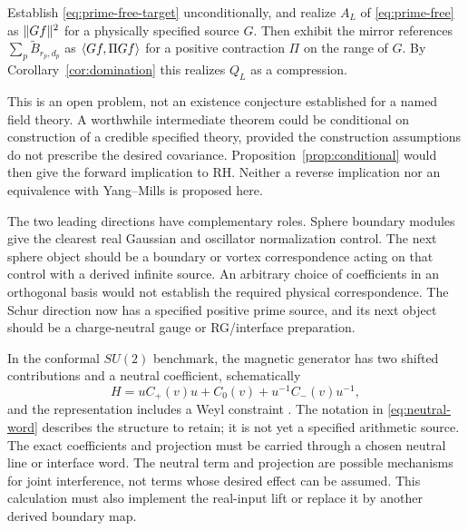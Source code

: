 \begin{problem}\label{prob:subtraction}
Establish \eqref{eq:prime-free-target} unconditionally, and realize
$A_L$ of \eqref{eq:prime-free} as $\lVert Gf\rVert^2$ for a physically specified
source $G$. Then exhibit the mirror references
$\sum_p\widetilde B_{r_p,d_p}$ as $\langle Gf,\Pi Gf\rangle$ for a positive
contraction $\Pi$ on the range of $G$. By
Corollary~\ref{cor:domination} this realizes $Q_L$ as a compression.
\end{problem}

This is an open problem, not an existence conjecture established for
a named field theory. A worthwhile intermediate theorem could be
conditional on construction of a credible specified theory, provided
the construction assumptions do not prescribe the desired covariance.
Proposition~\ref{prop:conditional} would then give the forward
implication to RH. Neither a reverse implication nor an equivalence
with Yang--Mills is proposed here.

The two leading directions have complementary roles. Sphere boundary
modules give the clearest real Gaussian and oscillator normalization
control. The next sphere object should be a boundary or vortex
correspondence acting on that control with a derived infinite source.
An arbitrary choice of coefficients in an orthogonal basis would not
establish the required physical correspondence. The Schur direction
now has a specified positive prime source, and its next object should
be a charge-neutral gauge or RG/interface preparation.

In the conformal $SU(2)$ benchmark, the magnetic generator has two
shifted contributions and a neutral coefficient, schematically
\begin{equation}\label{eq:neutral-word}
 H=uC_+(v)u+C_0(v)+u^{-1}C_-(v)u^{-1},
\end{equation}
and the representation includes a Weyl constraint
\cite[Sections 5.1.2--5.1.3]{Schur}. The notation in
\eqref{eq:neutral-word} describes the structure to retain; it is not
yet a specified arithmetic source. The exact coefficients and projection
must be carried through a chosen neutral line or interface word. The
neutral term and projection are possible mechanisms for joint
interference, not terms whose desired effect can be assumed. This
calculation must also implement the real-input lift or replace it by
another derived boundary map.

